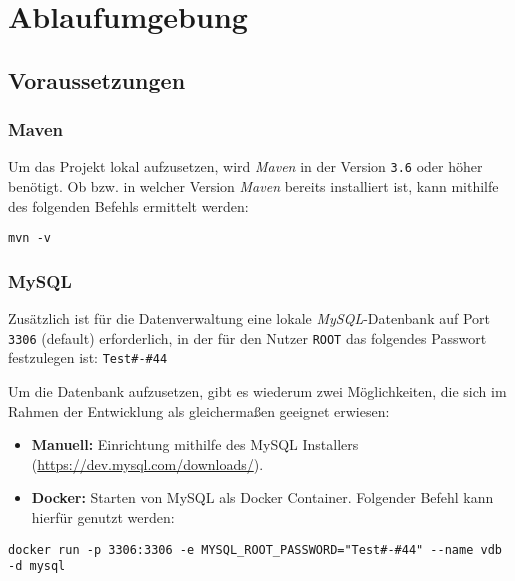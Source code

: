 \section{Ablaufumgebung}\label{sec:ablaufumgebung}

\subsection{Voraussetzungen}\label{subsec:voraussetzungen}

\subsubsection{Maven}

Um das Projekt lokal aufzusetzen, wird \textit{Maven} in der Version \texttt{3.6} oder h\"oher ben\"otigt.
Ob bzw. in welcher Version \textit{Maven} bereits installiert ist, kann mithilfe des folgenden Befehls ermittelt werden:

\begin{lstlisting}[label={lst:mvnv}]
mvn -v
\end{lstlisting}




\subsubsection{MySQL}

Zus\"atzlich ist für die Datenverwaltung eine lokale \textit{MySQL}-Datenbank auf Port \texttt{3306} (default) erforderlich,
in der f\"ur den Nutzer \texttt{ROOT} das folgendes Passwort festzulegen ist: \texttt{Test\#-\#44}

Um die Datenbank aufzusetzen, gibt es wiederum zwei M\"oglichkeiten, die sich im Rahmen der Entwicklung als gleichermaßen geeignet erwiesen:

\begin{itemize}
    \item \textbf{Manuell:} Einrichtung mithilfe des MySQL Installers (\url{https://dev.mysql.com/downloads/}).
    \item \textbf{Docker:} Starten von MySQL als Docker Container.
    Folgender Befehl kann hierf\"ur genutzt werden:
\end{itemize}

\begin{lstlisting}[label={lst:dockerdb}]
docker run -p 3306:3306 -e MYSQL_ROOT_PASSWORD="Test#-#44" --name vdb -d mysql
\end{lstlisting}

